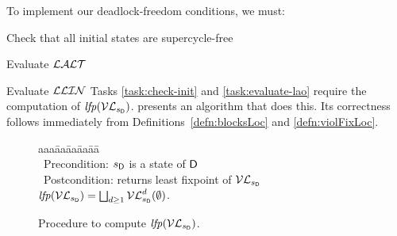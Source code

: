 To implement our deadlock-freedom conditions, we must:
\bn
\item \label{task:check-init} Check that all initial states are supercycle-free
\item \label{task:evaluate-lao} Evaluate $\mathcal{LALT}$
\item \label{task:evaluate-llin} Evaluate $\mathcal{LLIN}$
\en
%
Tasks \ref{task:check-init} and \ref{task:evaluate-lao} require the computation of $\mathit{lfp}(\mathcal{VL}_{s_\mathsf{D}})$.
 presents an algorithm that does this. Its
correctness follows immediately from 
Definitions~\ref{defn:blocksLoc} and \ref{defn:violFixLoc}.

   \label{secn:computeLFP}
%   

\newcommand{\fpt}{\mathit{fixpoint}}
\newcommand{\VLA}[5]{\ensuremath{\MATHIDN{V_{\dsk{#1}{#2},#3} [#4 #5]}}}    %

\begin{figure}[H]
\setcounter{lctr}{0}
\begin{tabbing}\label{alg:compute-lfp}
aaa\= aa\= aa\= aa\= aa\=\kill
\cLFP{$\dsk{\act}{\l},\sD$}\\
\cmnt\ Precondition: $s_\mathsf{D}$ is a state of $\mathsf{D}$\\
\cmnt\ Postcondition: returns least fixpoint of $\mathcal{VL}_{s_\mathsf{D}}$ \ie $\mathit{lfp}(\mathcal{VL}_{s_\mathsf{D}}) = \bigsqcup_{d \ge 1} \mathcal{VL}_{s_\mathsf{D}}^{d}(\emptyset)$.\\

\lio{\XS \gts \ewfg;}

\lio{\WHILEC{\true}}
   \lit{\YS \gts \cVL{\dsk{\act}{\l}, \sD, \XS};}
\lion{\ENDWHILE}
\end{tabbing}
\caption{Procedure to compute $\mathit{lfp}(\mathcal{VL}_{s_\mathsf{D}})$.}
\label{fig:algcomputeLFP}
\end{figure}




